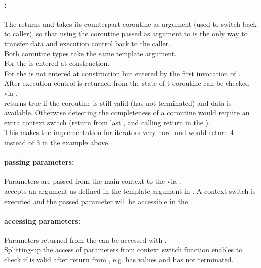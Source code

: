 \paragraph*{\corofunction:}
The \corofunction returns  and takes its counterpart-coroutine as
argument (used to switch back to caller), so that using the coroutine passed as
argument to \corofunction is the only way to transfer data and execution control
back to the caller.\\
Both coroutine types take the same template argument.\\
For \pullcoro the \corofunction is entered at \pullcoro construction.\\
For \pushcoro the \corofunction is not entered at \pushcoro construction but
entered by the first invocation of \pushcoroop.\\
After execution control is returned from \corofunction the state of t
coroutine can be checked via \pullcorobool.\\
\pullcorobool returns true if the coroutine is still valid (\corofunction has
not terminated) and data is available.
Otherwise detecting the completeness of a coroutine would require an extra context
switch (return from last \pullcoroop, \pushcoroop and calling return in the \corofunction).\\
This makes the implementation for iterators very hard and 
would return 4 instead of 3 in the example above.

\paragraph*{passing parameters:}
Parameters are passed from the main-context to the \corofunction via
\pushcoroop.\\
\newline
\pushcoroop accepts an argument as defined in the template argument in
\pushcoro.
A context switch is executed and the passed parameter will be accessible in
the \corofunction.

\paragraph*{accessing parameters:}
Parameters returned from the \corofunction can be accessed with
\pullcoroget.\\
\newline
Splitting-up the access of parameters from context switch function enables to
check if \pullcoro is valid after return from \pullcoroop, e.g. \pullcoro has
values and \corofunction has not terminated.

